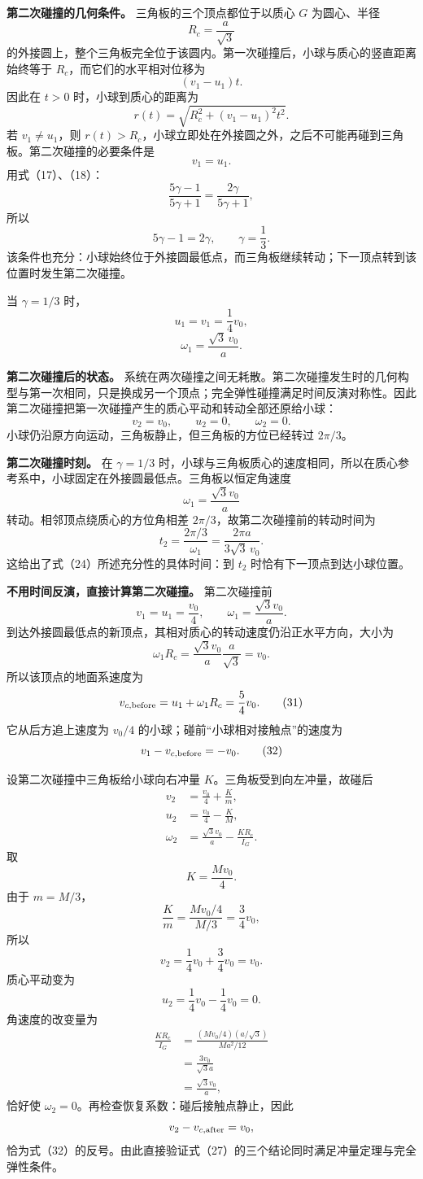 \documentclass[12pt,a4paper,UTF8]{ctexart}
\begin{document}
\textbf{第二次碰撞的几何条件。} 三角板的三个顶点都位于以质心 \(G\)
为圆心、半径 \[
R_c=\frac a{\sqrt3}
\]
的外接圆上，整个三角板完全位于该圆内。第一次碰撞后，小球与质心的竖直距离始终等于
\(R_c\)，而它们的水平相对位移为 \[
(v_1-u_1)t.
\] 因此在 \(t>0\) 时，小球到质心的距离为 \[
r(t)=\sqrt{R_c^2+(v_1-u_1)^2t^2}. \tag{22}
\] 若 \(v_1\ne u_1\)，则
\(r(t)>R_c\)，小球立即处在外接圆之外，之后不可能再碰到三角板。第二次碰撞的必要条件是
\[
v_1=u_1. \tag{23}
\] 用式（17）、（18）： \[
\frac{5\gamma-1}{5\gamma+1}
=\frac{2\gamma}{5\gamma+1},
\] 所以 \[
5\gamma-1=2\gamma,
\qquad
\boxed{\gamma=\frac13}. \tag{24}
\]
该条件也充分：小球始终位于外接圆最低点，而三角板继续转动；下一顶点转到该位置时发生第二次碰撞。

当 \(\gamma=1/3\) 时， \[
u_1=v_1=\frac14v_0, \tag{25}
\] \[
\omega_1=\frac{\sqrt3\,v_0}{a}. \tag{26}
\]

\textbf{第二次碰撞后的状态。}
系统在两次碰撞之间无耗散。第二次碰撞发生时的几何构型与第一次相同，只是换成另一个顶点；完全弹性碰撞满足时间反演对称性。因此第二次碰撞把第一次碰撞产生的质心平动和转动全部还原给小球：
\[
\boxed{
v_2=v_0,\qquad
u_2=0,\qquad
\omega_2=0
}. \tag{27}
\] 小球仍沿原方向运动，三角板静止，但三角板的方位已经转过 \(2\pi/3\)。

\textbf{第二次碰撞时刻。} 在 \(\gamma=1/3\)
时，小球与三角板质心的速度相同，所以在质心参考系中，小球固定在外接圆最低点。三角板以恒定角速度
\[
\omega_1=\frac{\sqrt3v_0}{a}
\] 转动。相邻顶点绕质心的方位角相差
\(2\pi/3\)，故第二次碰撞前的转动时间为 \[
\boxed{
t_2=\frac{2\pi/3}{\omega_1}
=\frac{2\pi a}{3\sqrt3\,v_0}
}. \tag{28}
\] 这给出了式（24）所述充分性的具体时间：到 \(t_2\)
时恰有下一顶点到达小球位置。

\textbf{不用时间反演，直接计算第二次碰撞。} 第二次碰撞前 \[
v_1=u_1=\frac{v_0}{4},
\qquad
\omega_1=\frac{\sqrt3v_0}{a}. \tag{29}
\] 到达外接圆最低点的新顶点，其相对质心的转动速度仍沿正水平方向，大小为
\[
\omega_1R_c
=\frac{\sqrt3v_0}{a}\frac a{\sqrt3}
=v_0. \tag{30}
\] 所以该顶点的地面系速度为 \[
v_{c,{\rm before}}
=u_1+\omega_1R_c
=\frac54v_0. \tag{31}
\] 它从后方追上速度为 \(v_0/4\) 的小球；碰前``小球相对接触点''的速度为
\[
v_1-v_{c,{\rm before}}=-v_0. \tag{32}
\]

设第二次碰撞中三角板给小球向右冲量 \(K\)。三角板受到向左冲量，故碰后 \[
\begin{aligned}
v_2&=\frac{v_0}{4}+\frac Km,\\
u_2&=\frac{v_0}{4}-\frac KM,\\
\omega_2&=\frac{\sqrt3v_0}{a}
-\frac{KR_c}{I_G}.
\end{aligned} \tag{33}
\] 取 \[
K=\frac{Mv_0}{4}. \tag{34}
\] 由于 \(m=M/3\)， \[
\frac Km
=\frac{Mv_0/4}{M/3}
=\frac34v_0, \tag{35}
\] 所以 \[
v_2=\frac14v_0+\frac34v_0=v_0. \tag{36}
\] 质心平动变为 \[
u_2=\frac14v_0-\frac14v_0=0. \tag{37}
\] 角速度的改变量为 \[
\begin{aligned}
\frac{KR_c}{I_G}
&=\frac{(Mv_0/4)(a/\sqrt3)}
{Ma^2/12}\\
&=\frac{3v_0}{\sqrt3a}\\
&=\frac{\sqrt3v_0}{a},
\end{aligned} \tag{38}
\] 恰好使 \(\omega_2=0\)。再检查恢复系数：碰后接触点静止，因此 \[
v_2-v_{c,{\rm after}}=v_0,
\]
恰为式（32）的反号。由此直接验证式（27）的三个结论同时满足冲量定理与完全弹性条件。
\end{document}
